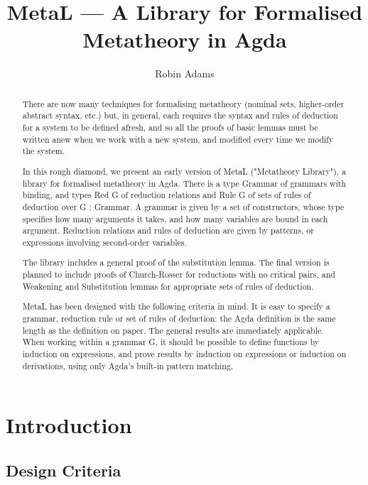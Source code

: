 \documentclass[envcountsame]{llncs}
\title{MetaL --- A Library for Formalised Metatheory in Agda}
\author{Robin Adams\inst{1}}
\institute{University of Bergen \email{r.adams@ii.uib.no}}
\begin{document}
\maketitle

\begin{abstract}
There are now many techniques for formalising metatheory (nominal sets, higher-order abstract syntax, etc.) but, in general, each requires the syntax and 
rules of deduction for a system to be defined afresh, and so all the proofs of basic lemmas must be written anew when we work with a new system, and
modified every time we modify the system. 

In this rough diamond, we present an early version of MetaL ("Metatheory Library"), a library for formalised metatheory in Agda. There is a type Grammar of 
grammars with binding, and types Red G of reduction relations and Rule G of sets of rules of deduction over G : Grammar. A grammar is given by a set of constructors, 
whose type specifies how many arguments it takes, and how many variables are bound in each argument. Reduction relations and rules of deduction are given by patterns,
or expressions involving second-order variables. 

The library includes a general proof of the substitution lemma. The final version is planned to include proofs of Church-Rosser for reductions with no critical pairs,
and Weakening and Substitution lemmas for appropriate sets of rules of deduction. 

MetaL has been designed with the following criteria in mind. It is easy to specify a grammar, reduction rule or set of rules of deduction: the Agda definition is the 
same length as the definition on paper. The general results are immediately applicable. When working within a grammar G, it should be possible to define functions by 
induction on expressions, and prove results by induction on expressions or induction on derivations, using only Agda's built-in pattern matching.
\end{abstract}


\section{Introduction}


\subsection{Design Criteria}
\end{document}
